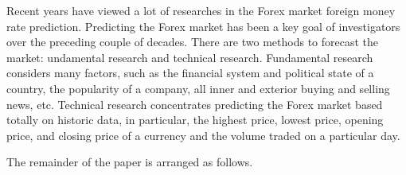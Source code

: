 Recent years have viewed a lot of researches in the Forex market foreign money rate prediction. Predicting the Forex market has been a key goal of investigators over the preceding couple of decades. There are two methods to forecast the market: undamental research and technical research. Fundamental research considers many factors, such as the financial system and political state of a country, the popularity of a company, all inner and exterior buying and selling news, etc. Technical research concentrates predicting the Forex market based totally on historic data, in particular, the highest price, lowest price, opening price, and closing price of a currency and the volume traded on a particular day. 

The remainder of the paper is arranged as follows.